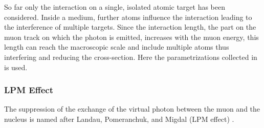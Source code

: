 So far only the interaction on a single, isolated atomic target has been considered.
Inside a medium, further atoms influence the interaction leading to the interference of multiple targets.
Since the interaction length, the part on the muon track on which the photon is emitted, increases with the muon energy, this length can reach the macroscopic scale and include multiple atoms thus interfering and reducing the cross-section.
Here the parametrizations collected in \cite{Klein99, Polityko01, Polityko02} is used.

\subsubsection{LPM Effect}

The suppression of the exchange of the virtual photon between the muon and the nucleus is named after Landau, Pomeranchuk, and Migdal (LPM effect) \cite{Landau53a, Landau53b, Migdal56, Migdal57}.


